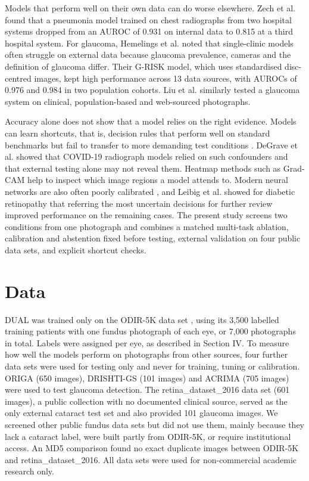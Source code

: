 \documentclass[conference,a4paper]{IEEEtran}
\begin{document}
Models that perform well on their own data can do worse elsewhere. Zech et al. \cite{ref17} found
that a pneumonia model trained on chest radiographs from two hospital systems dropped from an AUROC
of 0.931 on internal data to 0.815 at a third hospital system. For glaucoma, Hemelings et al.
\cite{ref9} noted that single-clinic models often struggle on external data because glaucoma
prevalence, cameras and the definition of glaucoma differ. Their G-RISK model, which uses
standardised disc-centred images, kept high performance across 13 data sources, with AUROCs of 0.976
and 0.984 in two population cohorts. Liu et al. \cite{ref7} similarly tested a glaucoma system on
clinical, population-based and web-sourced photographs.

Accuracy alone does not show that a model relies on the right evidence. Models can learn shortcuts,
that is, decision rules that perform well on standard benchmarks but fail to transfer to more
demanding test conditions \cite{ref18}. DeGrave et al. \cite{ref19} showed that COVID-19 radiograph
models relied on such confounders and that external testing alone may not reveal them. Heatmap
methods such as Grad-CAM \cite{ref10} help to inspect which image regions a model attends to. Modern
neural networks are also often poorly calibrated \cite{ref20}, and Leibig et al. \cite{ref21} showed
for diabetic retinopathy that referring the most uncertain decisions for further review improved
performance on the remaining cases. The present study screens two conditions from one photograph and
combines a matched multi-task ablation, calibration and abstention fixed before testing, external
validation on four public data sets, and explicit shortcut checks.

\section{Data}

DUAL was trained only on the ODIR-5K data set \cite{ref16}, using its 3,500 labelled training
patients with one fundus photograph of each eye, or 7,000 photographs in total. Labels were assigned
per eye, as described in Section IV. To measure how well the models perform on photographs from
other sources, four further data sets were used for testing only and never for training, tuning or
calibration. ORIGA \cite{ref22} (650 images), DRISHTI-GS \cite{ref23} (101 images) and ACRIMA
\cite{ref12} (705 images) were used to test glaucoma detection. The retina\_dataset\_2016 data set
\cite{ref24} (601 images), a public collection with no documented clinical source, served as the
only external cataract test set and also provided 101 glaucoma images. We screened other public
fundus data sets but did not use them, mainly because they lack a cataract label, were built partly
from ODIR-5K, or require institutional access. An MD5 comparison found no exact duplicate images
between ODIR-5K and retina\_dataset\_2016. All data sets were used for non-commercial academic
research only.
\end{document}
